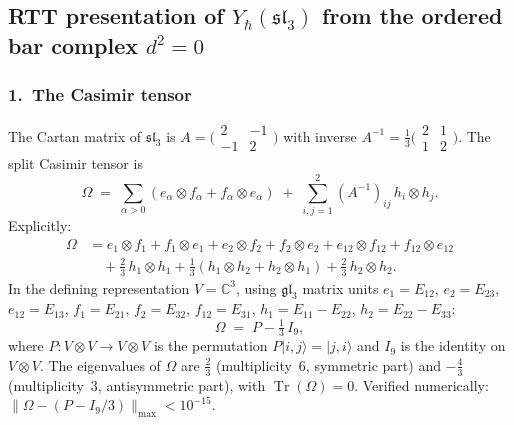 
\subsection*{RTT presentation of $Y_\hbar(\mathfrak{sl}_3)$
 from the ordered bar complex $d^2=0$}

\subsubsection*{1.\ The Casimir tensor}

The Cartan matrix of $\mathfrak{sl}_3$ is
$A = \bigl(\begin{smallmatrix} 2 & -1 \\ -1 & 2 \end{smallmatrix}\bigr)$
with inverse
$A^{-1} = \tfrac{1}{3}\bigl(\begin{smallmatrix} 2 & 1 \\ 1 & 2 \end{smallmatrix}\bigr)$.
The split Casimir tensor is
\begin{equation}\label{eq:sl3-casimir}
\Omega \;=\;
 \sum_{\alpha > 0} (e_\alpha \otimes f_\alpha + f_\alpha \otimes e_\alpha)
 \;+\; \sum_{i,j=1}^{2} (A^{-1})_{ij}\, h_i \otimes h_j.
\end{equation}
Explicitly:
\begin{align*}
\Omega &= e_1 \otimes f_1 + f_1 \otimes e_1
 + e_2 \otimes f_2 + f_2 \otimes e_2
 + e_{12} \otimes f_{12} + f_{12} \otimes e_{12} \\
 &\quad + \tfrac{2}{3}\, h_1 \otimes h_1
 + \tfrac{1}{3}(h_1 \otimes h_2 + h_2 \otimes h_1)
 + \tfrac{2}{3}\, h_2 \otimes h_2.
\end{align*}
In the defining representation $V = \mathbb{C}^3$,
using $\mathfrak{gl}_3$ matrix units
$e_1 = E_{12}$, $e_2 = E_{23}$, $e_{12} = E_{13}$,
$f_1 = E_{21}$, $f_2 = E_{32}$, $f_{12} = E_{31}$,
$h_1 = E_{11} - E_{22}$, $h_2 = E_{22} - E_{33}$:
\begin{equation}\label{eq:casimir-perm}
\Omega \;=\; P - \tfrac{1}{3}\, I_9,
\end{equation}
where $P \colon V \otimes V \to V \otimes V$ is the permutation
$P|i,j\rangle = |j,i\rangle$ and $I_9$ is the identity on
$V \otimes V$. The eigenvalues of $\Omega$ are
$\tfrac{2}{3}$ (multiplicity~$6$, symmetric part)
and $-\tfrac{4}{3}$ (multiplicity~$3$, antisymmetric part),
with $\operatorname{Tr}(\Omega) = 0$.
Verified numerically: $\|\Omega - (P - I_9/3)\|_{\max} < 10^{-15}$.

